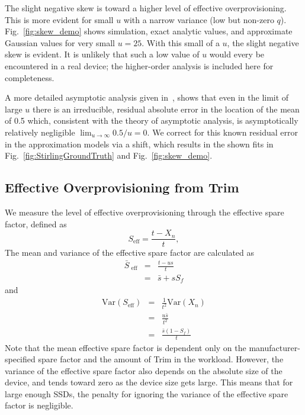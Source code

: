 \documentclass[prodmode,acmtos]{acmsmall}
\begin{document}
The slight negative skew is toward a higher level of effective overprovisioning.  This is more evident for small $u$ with a narrow variance (low but non-zero $q$).  Fig.~\ref{fig:skew_demo} shows simulation, exact analytic values, and approximate Gaussian values for very small $u=25$.  With this small of a $u$, the slight negative skew is evident.  It is unlikely that such a low value of $u$ would every be encountered in a real device; the higher-order analysis is included here for completeness.

A more detailed asymptotic analysis given in~\cite{TashaDissertation}, shows that even in the limit of large $u$ there is an irreducible, residual  absolute  error in the location of the mean of 0.5 which, consistent with the theory of asymptotic analysis,  is asymptotically relatively negligible $\lim_{u \to \infty} 0.5/u = 0$. We correct for this known residual error in the approximation models via a shift, which results in the shown fits in Fig.~\ref{fig:StirlingGroundTruth} and Fig.~\ref{fig:skew_demo}.



\subsection{Effective Overprovisioning from Trim}
We measure the level of effective overprovisioning through the effective spare factor, defined as
\begin{equation*}
S_{\text{eff}} = \frac{t-X_n}{t},
\end{equation*}
The mean and variance of the effective spare factor are calculated as
\begin{eqnarray*}
\bar{S}_{\text{ eff}} &=& \frac{t-us}{t}\\
&=& \bar s + s S_f
\end{eqnarray*}
and
\begin{eqnarray*}
\text{Var}(S_\text{eff}) &=& \frac{1}{t^2} \text{Var}(X_n) \\
&=& \frac{u\bar{s}}{t^2} \\
&=& \frac{\bar{s}(1-S_f)}{t}
\end{eqnarray*}
Note that the mean effective spare factor is dependent only on the manufacturer-specified spare factor and the amount of Trim in the workload.  However, the variance of the effective spare factor also depends on the absolute size of the device, and tends toward zero as the device size gets large.  This means that for large enough SSDs, the penalty for ignoring the variance of the effective spare factor is negligible.
\end{document}
